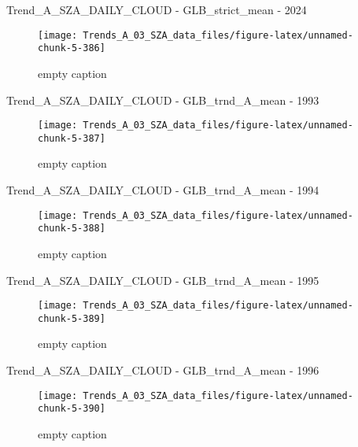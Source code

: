 \documentclass[
  10pt,
  a4paper,oneside]{article}
\begin{document}
Trend\_A\_SZA\_DAILY\_CLOUD - GLB\_strict\_mean - 2024

\begin{figure}[!ht]

{\centering \texttt{[image: Trends\_A\_03\_SZA\_data\_files/figure-latex/unnamed-chunk-5-386]} 

}

\caption{ empty caption }\label{fig:unnamed-chunk-5-386}
\end{figure}

Trend\_A\_SZA\_DAILY\_CLOUD - GLB\_trnd\_A\_mean - 1993

\begin{figure}[!ht]

{\centering \texttt{[image: Trends\_A\_03\_SZA\_data\_files/figure-latex/unnamed-chunk-5-387]} 

}

\caption{ empty caption }\label{fig:unnamed-chunk-5-387}
\end{figure}

Trend\_A\_SZA\_DAILY\_CLOUD - GLB\_trnd\_A\_mean - 1994

\begin{figure}[!ht]

{\centering \texttt{[image: Trends\_A\_03\_SZA\_data\_files/figure-latex/unnamed-chunk-5-388]} 

}

\caption{ empty caption }\label{fig:unnamed-chunk-5-388}
\end{figure}

Trend\_A\_SZA\_DAILY\_CLOUD - GLB\_trnd\_A\_mean - 1995

\begin{figure}[!ht]

{\centering \texttt{[image: Trends\_A\_03\_SZA\_data\_files/figure-latex/unnamed-chunk-5-389]} 

}

\caption{ empty caption }\label{fig:unnamed-chunk-5-389}
\end{figure}

Trend\_A\_SZA\_DAILY\_CLOUD - GLB\_trnd\_A\_mean - 1996

\begin{figure}[!ht]

{\centering \texttt{[image: Trends\_A\_03\_SZA\_data\_files/figure-latex/unnamed-chunk-5-390]} 

}

\caption{ empty caption }\label{fig:unnamed-chunk-5-390}
\end{figure}
\end{document}
